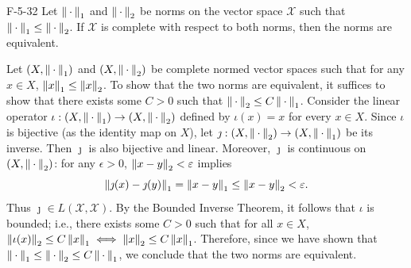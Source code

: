 \documentclass{article}
\begin{document}
	
	\begin{prb}{F-5-32}
		Let $\left\Vert \hspace{2pt}\cdot\hspace{2pt} \right\Vert_{1}$ and $\left\Vert \hspace{2pt}\cdot\hspace{2pt} \right\Vert_{2}$ be norms on the vector space $\mathscr{X}$ such that $\left\Vert \hspace{2pt}\cdot\hspace{2pt} \right\Vert_{1} \leq \left\Vert \hspace{2pt}\cdot\hspace{2pt} \right\Vert_{2}$. If $\mathscr{X}$ is complete with respect to both norms, then the norms are equivalent. 
	\end{prb}
	Let $(X, \left\Vert \hspace{2pt}\cdot\hspace{2pt} \right\Vert_{1})$ and $(X, \left\Vert \hspace{2pt}\cdot\hspace{2pt} \right\Vert_{2})$ be complete normed vector spaces such that for any $x \in X$, $\left\Vert x \right\Vert_{1} \leq \left\Vert x \right\Vert_{2}$. To show that the two norms are equivalent, it suffices to show that there exists some $C > 0$ such that $\left\Vert \hspace{2pt}\cdot\hspace{2pt} \right\Vert_{2} \leq C \left\Vert \hspace{2pt}\cdot\hspace{2pt} \right\Vert_{1}$. Consider the linear operator $\iota: (X, \left\Vert \hspace{2pt}\cdot\hspace{2pt} \right\Vert_{1}) \to (X, \left\Vert \hspace{2pt}\cdot\hspace{2pt} \right\Vert_{2})$ defined by $\iota(x) = x$ for every $x \in X$. Since $\iota$ is bijective (as the identity map on $X$), let $\jmath: (X, \left\Vert \hspace{2pt}\cdot\hspace{2pt} \right\Vert_{2}) \to (X, \left\Vert \hspace{2pt}\cdot\hspace{2pt} \right\Vert_{1})$ be its inverse. Then $\jmath$ is also bijective and linear. Moreover, $\jmath$ is continuous on $(X, \left\Vert \hspace{2pt}\cdot\hspace{2pt} \right\Vert_{2})$: for any $\epsilon > 0$, $\left\Vert x - y \right\Vert_{2} < \varepsilon$ implies 
	\begin{equation*}
		\left\Vert \jmath(x) - \jmath(y) \right\Vert_{1} = \left\Vert x - y \right\Vert_{1} \leq \left\Vert x - y \right\Vert_{2} < \varepsilon. 
	\end{equation*}
	Thus $\jmath \in L(\mathscr{X}, \mathscr{X})$. By the Bounded Inverse Theorem, it follows that $\iota$ is bounded; i.e., there exists some $C > 0$ such that for all $x \in X$, $\left\Vert \iota(x) \right\Vert_{2} \leq C\left\Vert x \right\Vert_{1} \iff \left\Vert x \right\Vert_{2} \leq C\left\Vert x \right\Vert_{1}$. Therefore, since we have shown that $\left\Vert \hspace{2pt}\cdot\hspace{2pt} \right\Vert_{1} \leq \left\Vert \hspace{2pt}\cdot\hspace{2pt} \right\Vert_{2} \leq C\left\Vert \hspace{2pt}\cdot\hspace{2pt} \right\Vert_{1}$, we conclude that the two norms are equivalent. 
	
\end{document}

